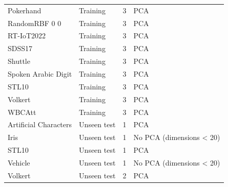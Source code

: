 \begin{scriptsize}
\begin{longtable}{p{4.1cm}p{2.2cm}r p{3.5cm}}
Pokerhand & Training & 3 & PCA \\
RandomRBF 0 0 & Training & 3 & PCA \\
RT-IoT2022 & Training & 3 & PCA \\
SDSS17 & Training & 3 & PCA \\
Shuttle & Training & 3 & PCA \\
Spoken Arabic Digit & Training & 3 & PCA \\
STL10 & Training & 3 & PCA \\
Volkert & Training & 3 & PCA \\
WBCAtt & Training & 3 & PCA \\
Artificial Characters & Unseen test & 1 & PCA \\
Iris & Unseen test & 1 & No PCA (dimensions < 20) \\
STL10 & Unseen test & 1 & PCA \\
Vehicle & Unseen test & 1 & No PCA (dimensions < 20) \\
Volkert & Unseen test & 2 & PCA \\
\end{longtable}
\end{scriptsize}

